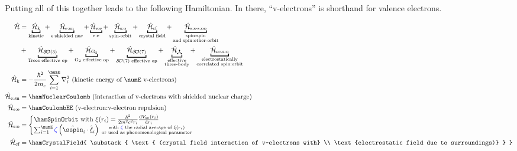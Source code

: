 \documentclass{article}
\begin{document}
Putting all of this together leads to the following Hamiltonian. In there, ``v-electrons'' is shorthand for valence electrons.

\begin{align}
	\ham &= \underbracket{\hamKineticSymbol}_{\text{kinetic}}
		 + \underbracket{\hamNuclearCoulombSymbol}_{\text{e:shielded nuc}}
		 + \underbracket{\hamCoulombEESymbol}_{\text{e:e}}
		 + \underbracket{\hamSpinOrbitSymbol}_{\text{spin-orbit}}
		 + \underbracket{\hamCrystalFieldSymbol}_{\text{crystal field}}
		 + \underbracket{\hamSpinSpinSpinOtherOrbitSymbol}_{
		 			\substack{
		 				\text{spin:spin} \\ 
		 				\text{and spin:other-orbit}
		 				}
		 			} \\
		 & + \underbracket{\hamTreesSymbol}_\text{Trees effective op} 
		 + \underbracket{\hamGTwoSymbol}_\text{G${}_2$ effective op} 
		 + \underbracket{\hamSOSevenSymbol}_\text{$\SO{7}$ effective op} 
		 + \underbracket{\ham_{\trispoke}}_{\substack{
		 \text{effective} \\
		 \text{three-body}}} 
		 + \underbracket{\hamECSOSymbol}_{
		 		\substack{
		 			\text{electrostatically} \\
		 			\text{correlated spin:orbit}
		 			} 
		 			} \\
	\hamKineticSymbol &= -\frac{\hbar^2}{2m_e}\sum_{i=1}^\numE \nabla_i^2 \text{ (kinetic energy of $\numE$ v-electrons)}\\
	\hamNuclearCoulombSymbol &= \hamNuclearCoulomb \text{ (interaction of v-electrons with shielded nuclear charge)} \\
	\ham_\text{e:e} &= \hamCoulombEE \text{ (v-electron:v-electron repulsion)} \\  
	\hamSpinOrbitSymbol &= \begin{cases} 
			\hamSpinOrbit \text{ with } \xi{(r_i)} = \frac{\hbar^2}{2 m^2 c^2 r_i} \frac{\diff{V_\text{sn}(r_i)}}{\diff{r_i}} \\
			\sum_{i=1}^\numE \spinZeta \paren{\op{\sspin}_i \cdot \op{\lorb}_i} {{\substack{
						\text{ with $\spinZeta$ the radial average of $\xi(r_i)$} \\ 
						\text{ or used as phenomenological parameter}  
						}
					}}    
			\end{cases} \\  
	\hamCrystalFieldSymbol &= \hamCrystalField {   
		\substack{
			\text{ (crystal field interaction of v-electrons with} \\
			\text{electrostatic field due to surroundings)}
			}
			}\\  

\end{align}
\end{document}
